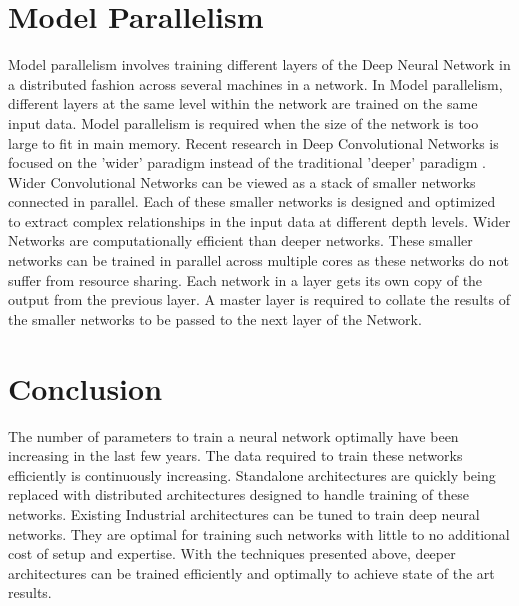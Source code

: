 \documentclass[sigconf]{acmart}
\begin{document}
\section{Model Parallelism} \label{layer}

Model parallelism involves training different layers of the Deep Neural Network in a distributed fashion across several machines in a network. In Model parallelism, different layers at the same level within the network are trained on the same input data. Model parallelism is required when the size of the network is too large to fit in main memory. Recent research in Deep Convolutional Networks is focused on the 'wider' paradigm instead of the traditional 'deeper' paradigm \cite{Googlenet}. Wider Convolutional Networks can be viewed as a stack of smaller networks connected in parallel. Each of these smaller networks is designed and optimized to extract complex relationships in the input data at different depth levels. Wider Networks are computationally efficient than deeper networks. These smaller networks can be trained in parallel across multiple cores as these networks do not suffer from resource sharing. Each network in a layer gets its own copy of the output from the previous layer. A master layer is required to collate the results of the smaller networks to be passed to the next layer of the Network.


\section{Conclusion}

The number of parameters to train a neural network optimally have been increasing in the last few years. The data required to train these networks efficiently is continuously increasing. Standalone architectures are quickly being replaced with distributed architectures designed to handle training of these networks. Existing Industrial architectures can be tuned to train deep neural networks. They are optimal for training such networks with little to no additional cost of setup and expertise. With the techniques presented above, deeper architectures can be trained efficiently and optimally to achieve state of the art results.


 
\end{document}

